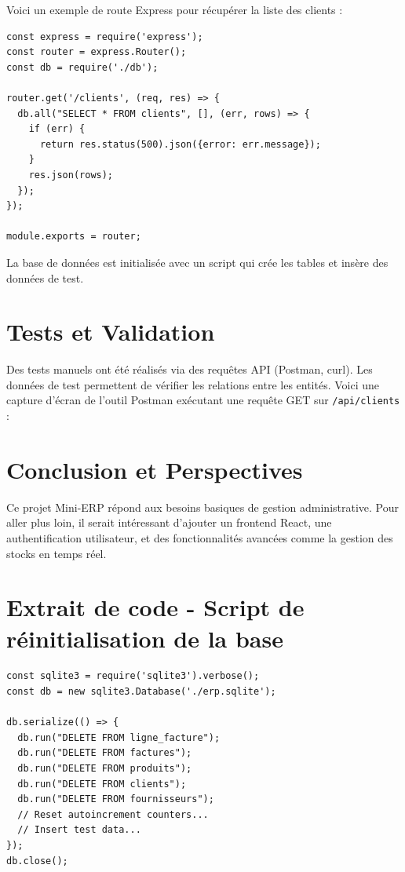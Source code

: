 \documentclass[a4paper,12pt]{article}
\begin{document}
Voici un exemple de route Express pour récupérer la liste des clients :

\begin{lstlisting}[caption=Route GET pour récupérer les clients]
const express = require('express');
const router = express.Router();
const db = require('./db');

router.get('/clients', (req, res) => {
  db.all("SELECT * FROM clients", [], (err, rows) => {
    if (err) {
      return res.status(500).json({error: err.message});
    }
    res.json(rows);
  });
});

module.exports = router;
\end{lstlisting}

La base de données est initialisée avec un script qui crée les tables et insère des données de test.

\section{Tests et Validation}

Des tests manuels ont été réalisés via des requêtes API (Postman, curl). Les données de test permettent de vérifier les relations entre les entités. Voici une capture d’écran de l’outil Postman exécutant une requête GET sur \texttt{/api/clients} :

\section{Conclusion et Perspectives}

Ce projet Mini-ERP répond aux besoins basiques de gestion administrative. Pour aller plus loin, il serait intéressant d’ajouter un frontend React, une authentification utilisateur, et des fonctionnalités avancées comme la gestion des stocks en temps réel.

\appendix
\section{Extrait de code - Script de réinitialisation de la base}

\begin{lstlisting}[caption=reset_db.js]
const sqlite3 = require('sqlite3').verbose();
const db = new sqlite3.Database('./erp.sqlite');

db.serialize(() => {
  db.run("DELETE FROM ligne_facture");
  db.run("DELETE FROM factures");
  db.run("DELETE FROM produits");
  db.run("DELETE FROM clients");
  db.run("DELETE FROM fournisseurs");
  // Reset autoincrement counters...
  // Insert test data...
});
db.close();
\end{lstlisting}
\end{document}
